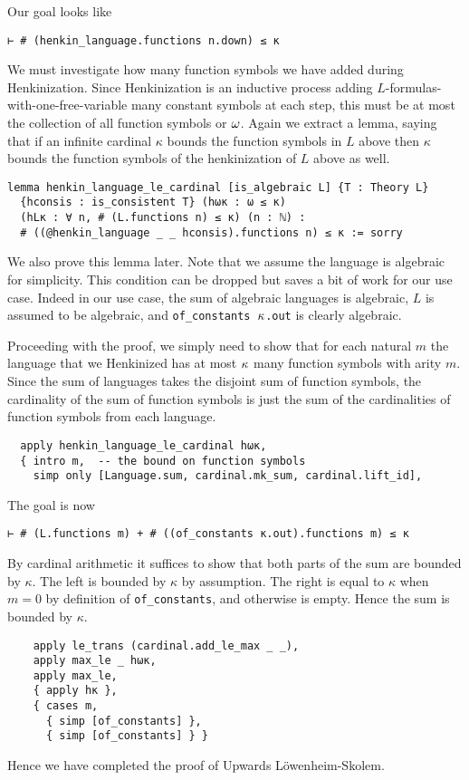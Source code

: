 Our goal looks like
\begin{lstlisting}
⊢ # (henkin_language.functions n.down) ≤ κ \end{lstlisting}

We must investigate how many function symbols we have added
during Henkinization.
Since Henkinization is an inductive process adding
$L$-formulas-with-one-free-variable many constant symbols at
each step, this must be at most the collection of all function symbols
or $\omega$.
Again we extract a lemma,
saying that if an infinite cardinal $\kappa$ bounds the
function symbols in $L$ above then
$\kappa$ bounds the function symbols of the henkinization of $L$
above as well.

\begin{lstlisting}
lemma henkin_language_le_cardinal [is_algebraic L] {T : Theory L}
  {hconsis : is_consistent T} (hωκ : ω ≤ κ)
  (hLκ : ∀ n, # (L.functions n) ≤ κ) (n : ℕ) :
  # ((@henkin_language _ _ hconsis).functions n) ≤ κ := sorry \end{lstlisting}

We also prove this lemma later. %
Note that we assume the language is algebraic for simplicity.
This condition can be dropped but saves a bit of work for our use case.
Indeed in our use case, the sum of algebraic languages is algebraic,
$L$ is assumed to be algebraic, and \texttt{of\_constants $\kappa$.out}
is clearly algebraic.

Proceeding with the proof, we simply need to show that
for each natural $m$
the language that we Henkinized has at most $\kappa$ many function symbols
with arity $m$.
Since the sum of languages takes the disjoint sum of function symbols,
the cardinality of the sum of function symbols is just the sum of
the cardinalities of function symbols from each language.

\begin{lstlisting}
  apply henkin_language_le_cardinal hωκ,
  { intro m,  -- the bound on function symbols
    simp only [Language.sum, cardinal.mk_sum, cardinal.lift_id], \end{lstlisting}

The goal is now

\begin{lstlisting}
⊢ # (L.functions m) + # ((of_constants κ.out).functions m) ≤ κ \end{lstlisting}

By cardinal arithmetic it suffices to show that both parts of the
sum are bounded by $\kappa$.
The left is bounded by $\kappa$ {by assumption}.
The right is equal to $\kappa$ when $m = 0$ by definition of
\texttt{of\_constants}, and otherwise is empty.
Hence the sum is bounded by $\kappa$.

\begin{lstlisting}
    apply le_trans (cardinal.add_le_max _ _),
    apply max_le _ hωκ,
    apply max_le,
    { apply hκ },
    { cases m,
      { simp [of_constants] },
      { simp [of_constants] } } \end{lstlisting}

Hence we have completed the proof of Upwards L\"{o}wenheim-Skolem.
